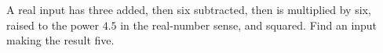 A real input has three added, then six subtracted, then is multiplied by six, raised to the power $4.5$ in the real-number sense, and squared. Find an input making the result five.
